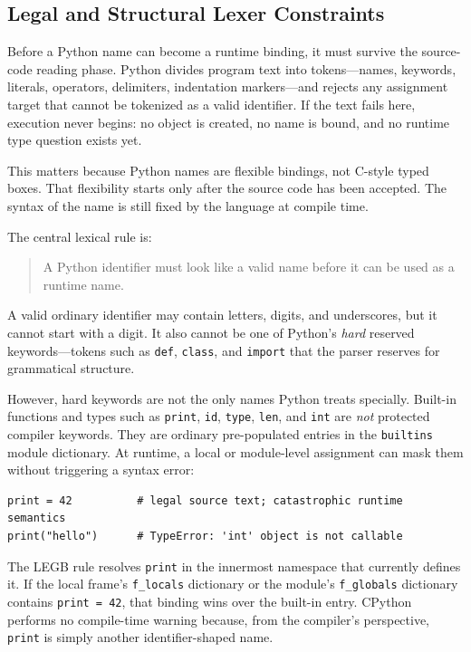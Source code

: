 \subsection{Legal and Structural Lexer Constraints}

Before a Python name can become a runtime binding, it must survive the source-code reading phase. Python divides program text into tokens---names, keywords, literals, operators, delimiters, indentation markers---and rejects any assignment target that cannot be tokenized as a valid identifier. If the text fails here, execution never begins: no object is created, no name is bound, and no runtime type question exists yet.

This matters because Python names are flexible bindings, not C-style typed boxes. That flexibility starts only after the source code has been accepted. The syntax of the name is still fixed by the language at compile time.

The central lexical rule is:

\begin{quote}
A Python identifier must look like a valid name before it can be used as a runtime name.
\end{quote}

A valid ordinary identifier may contain letters, digits, and underscores, but it cannot start with a digit. It also cannot be one of Python's \emph{hard} reserved keywords---tokens such as \texttt{def}, \texttt{class}, and \texttt{import} that the parser reserves for grammatical structure.

However, hard keywords are not the only names Python treats specially. Built-in functions and types such as \texttt{print}, \texttt{id}, \texttt{type}, \texttt{len}, and \texttt{int} are \emph{not} protected compiler keywords. They are ordinary pre-populated entries in the \texttt{builtins} module dictionary. At runtime, a local or module-level assignment can mask them without triggering a syntax error:

\begin{verbatim}
print = 42          # legal source text; catastrophic runtime semantics
print("hello")      # TypeError: 'int' object is not callable
\end{verbatim}

The LEGB rule resolves \texttt{print} in the innermost namespace that currently defines it. If the local frame's \texttt{f\_locals} dictionary or the module's \texttt{f\_globals} dictionary contains \texttt{print = 42}, that binding wins over the built-in entry. CPython performs no compile-time warning because, from the compiler's perspective, \texttt{print} is simply another identifier-shaped name.

